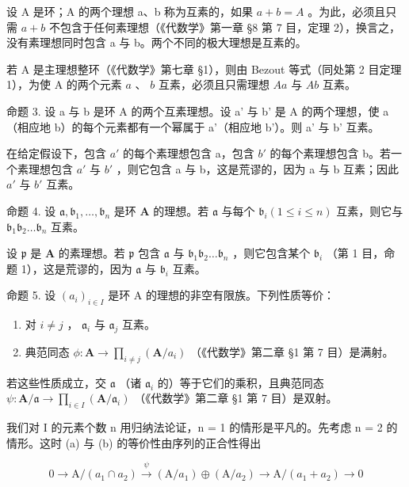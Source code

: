设 A 是环；A 的两个理想 a、b 称为互素的，如果 \(a + b = A\) 。为此，必须且只需 \(a + b\) 不包含于任何素理想（《代数学》第一章 §8 第 7 目，定理 2），换言之，没有素理想同时包含 a 与 b。两个不同的极大理想是互素的。

若 A 是主理想整环（《代数学》第七章 §1），则由 Bezout 等式（同处第 2 目定理 1），为使 A 的两个元素 \(a\) 、 \(b\) 互素，必须且只需理想 \(Aa\) 与 \(Ab\) 互素。

命题 3. 设 a 与 b 是环 A 的两个互素理想。设 a' 与 b' 是 A 的两个理想，使 a（相应地 b）的每个元素都有一个幂属于 a'（相应地 b'）。则 a' 与 b' 互素。

在给定假设下，包含 \(a'\) 的每个素理想包含 a，包含 \(b'\) 的每个素理想包含 b。若一个素理想包含 \(a'\) 与 \(b'\) ，则它包含 a 与 b，这是荒谬的，因为 a 与 b 互素；因此 \(a'\) 与 \(b'\) 互素。

命题 4. 设 \(\mathfrak{a}, \mathfrak{b}_1, \ldots, \mathfrak{b}_n\) 是环 \(\mathbf{A}\) 的理想。若 \(\mathfrak{a}\) 与每个 \(\mathfrak{b}_i (1 \leqslant i \leqslant n)\) 互素，则它与 \(\mathfrak{b}_1\mathfrak{b}_2 \ldots \mathfrak{b}_n\) 互素。

设 \(\mathfrak{p}\) 是 \(\mathbf{A}\) 的素理想。若 \(\mathfrak{p}\) 包含 \(\mathfrak{a}\) 与 \(\mathfrak{b}_1\mathfrak{b}_2\ldots \mathfrak{b}_n\) ，则它包含某个 \(\mathfrak{b}_i\) （第 1 目，命题 1），这是荒谬的，因为 \(\mathfrak{a}\) 与 \(\mathfrak{b}_i\) 互素。

命题 5. 设 \((a_{i})_{i\in I}\) 是环 A 的理想的非空有限族。下列性质等价：

\begin{enumerate}
\def\labelenumi{(\alph{enumi})}
\item
  对 \(i \neq j\) ， \(\mathfrak{a}_i\) 与 \(\mathfrak{a}_j\) 互素。
\item
  典范同态 \(\phi: \mathbf{A} \to \prod_{i \neq j} (\mathbf{A} / a_i)\) （《代数学》第二章 §1 第 7 目）是满射。
\end{enumerate}

若这些性质成立，交 \(\mathfrak{a}\) （诸 \(\mathfrak{a}_i\) 的）等于它们的乘积，且典范同态 \(\psi: \mathbf{A} / \mathfrak{a} \to \prod_{i \in I} (\mathbf{A} / \mathfrak{a}_i)\) （《代数学》第二章 §1 第 7 目）是双射。

我们对 I 的元素个数 n 用归纳法论证，n = 1 的情形是平凡的。先考虑 n = 2 的情形。这时 (a) 与 (b) 的等价性由序列的正合性得出

\[
0 \longrightarrow \mathrm{A} / (a _ {1} \cap a _ {2}) \stackrel {\psi} {\longrightarrow} (\mathrm{A} / a _ {1}) \oplus (\mathrm{A} / a _ {2}) \longrightarrow \mathrm{A} / (a _ {1} + a _ {2}) \longrightarrow 0
\]

